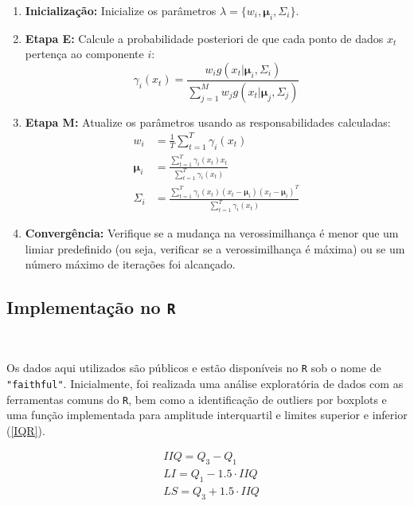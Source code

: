 \documentclass[12pt]{article}
\begin{document}
\begin{enumerate}
    \item \textbf{Inicialização:} Inicialize os parâmetros $\lambda = \{w_i, \mathbf{\mu}_i, \Sigma_i\}$.
    \item \textbf{Etapa E:} Calcule a probabilidade posteriori de que cada ponto de dados $x_t$ pertença ao componente $i$:
    \begin{equation}
    \gamma_{i}(x_t) = \frac{w_i g(x_t|\mathbf{\mu}_i, \Sigma_i)}{\sum_{j=1}^{M} w_j g(x_t|\mathbf{\mu}_j, \Sigma_j)}
    \end{equation}
    \item \textbf{Etapa M:} Atualize os parâmetros usando as responsabilidades calculadas:
    \begin{align}
    w_i &= \frac{1}{T} \sum_{t=1}^{T} \gamma_{i}(x_t) \\
    \mathbf{\mu}_i &= \frac{\sum_{t=1}^{T} \gamma_{i}(x_t) x_t}{\sum_{t=1}^{T} \gamma_{i}(x_t)} \\
    \Sigma_i &= \frac{\sum_{t=1}^{T} \gamma_{i}(x_t) (x_t - \mathbf{\mu}_i)(x_t - \mathbf{\mu}_i)^T}{\sum_{t=1}^{T} \gamma_{i}(x_t)}
    \end{align}
    \item \textbf{Convergência:} Verifique se a mudança na verossimilhança é menor que um limiar predefinido (ou seja, verificar se a verossimilhança é máxima) ou se um número máximo de iterações foi alcançado.
\end{enumerate}

\subsection{Implementação no \texttt{R}}

\

Os dados aqui utilizados são públicos e estão disponíveis no \texttt{R} sob o nome de \texttt{"faithful"}. Inicialmente, foi realizada uma análise exploratória de dados com as ferramentas comuns do \texttt{R}, bem como a identificação de outliers por boxplots e uma função implementada para amplitude interquartil e limites superior e inferior (\ref{IQR}).

\begin{equation} \label{IQR}
    \begin{split}
        & IIQ = Q_3 - Q_1 \\
        & LI = Q_1 - 1.5 \cdot IIQ \\
        & LS = Q_3 + 1.5 \cdot IIQ
    \end{split}
\end{equation}
\end{document}
